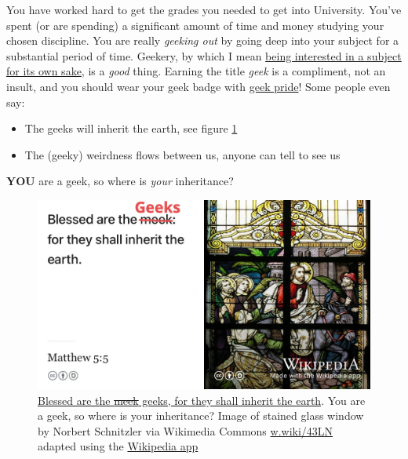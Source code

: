 \documentclass[
]{book}
\providecommand{\tightlist}{%
  \setlength{\itemsep}{0pt}\setlength{\parskip}{0pt}}
\begin{document}
You have worked hard to get the grades you needed to get into University. You've spent (or are spending) a significant amount of time and money studying your chosen discipline. You are really \emph{geeking out} by going deep into your subject for a substantial period of time. Geekery, by which I mean \href{https://en.wikipedia.org/wiki/Geek}{being interested in a subject for its own sake}, is a \emph{good} thing. Earning the title \emph{geek} is a compliment, not an insult, and you should wear your geek badge with \href{https://en.wikipedia.org/wiki/Geek_Pride_Day}{geek pride}! Some people even say:

\begin{itemize}
\tightlist
\item
  The geeks will inherit the earth, see figure \ref{fig:geekout-fig}
\item
  The (geeky) weirdness flows between us, anyone can tell to see us \citep{freakscene}
\end{itemize}

\textbf{YOU} are a geek, so where is \emph{your} inheritance?

\begin{figure}

{\centering \includegraphics[width=0.99\linewidth]{images/blessed-are-the-geeks} 

}

\caption{\href{https://en.wikipedia.org/wiki/Matthew_5:5}{Blessed are the \sout{meek} geeks, for they shall inherit the earth}. \citep{inherit, blessed} You are a geek, so where is your inheritance? Image of stained glass window by Norbert Schnitzler via Wikimedia Commons \href{https://w.wiki/43LN}{w.wiki/43LN} adapted using the \href{https://apps.apple.com/us/app/wikipedia/id324715238}{Wikipedia app}}\label{fig:geekout-fig}
\end{figure}
\end{document}
